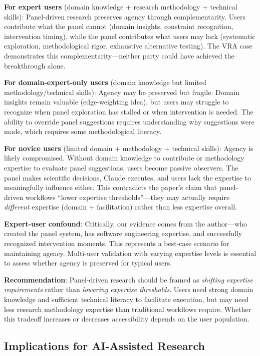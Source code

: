 \textbf{For expert users} (domain knowledge + research methodology + technical skills): Panel-driven research preserves agency through complementarity. Users contribute what the panel cannot (domain insights, constraint recognition, intervention timing), while the panel contributes what users may lack (systematic exploration, methodological rigor, exhaustive alternative testing). The VRA case demonstrates this complementarity---neither party could have achieved the breakthrough alone.

\textbf{For domain-expert-only users} (domain knowledge but limited methodology/technical skills): Agency may be preserved but fragile. Domain insights remain valuable (edge-weighting idea), but users may struggle to recognize when panel exploration has stalled or when intervention is needed. The ability to override panel suggestions requires understanding why suggestions were made, which requires some methodological literacy.

\textbf{For novice users} (limited domain + methodology + technical skills): Agency is likely compromised. Without domain knowledge to contribute or methodology expertise to evaluate panel suggestions, users become passive observers. The panel makes scientific decisions, Claude executes, and users lack the expertise to meaningfully influence either. This contradicts the paper's claim that panel-driven workflows ``lower expertise thresholds''---they may actually require \textit{different} expertise (domain + facilitation) rather than less expertise overall.

\textbf{Expert-user confound}: Critically, our evidence comes from the author---who created the panel system, has software engineering expertise, and successfully recognized intervention moments. This represents a best-case scenario for maintaining agency. Multi-user validation with varying expertise levels is essential to assess whether agency is preserved for typical users.

\textbf{Recommendation}: Panel-driven research should be framed as \textit{shifting expertise requirements} rather than \textit{lowering expertise thresholds}. Users need strong domain knowledge and sufficient technical literacy to facilitate execution, but may need less research methodology expertise than traditional workflows require. Whether this tradeoff increases or decreases accessibility depends on the user population.

\subsection{Implications for AI-Assisted Research}

